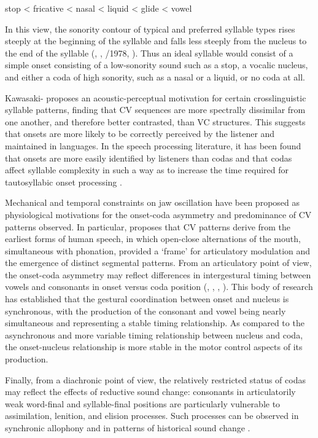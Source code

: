 \ea\label{ex:(1.6)}
  stop < fricative < nasal < liquid < glide < vowel
\z

In this view, the sonority contour of typical and preferred syllable types rises steeply at the beginning of the syllable and falls less steeply from the nucleus to the end of the syllable (\citealt{Zwicky1972}, \citealt{Hooper1976}, \citealt{Greenberg1965}/1978, \citealt{Clements1990}). Thus an ideal syllable would consist of a simple onset consisting of a low-sonority sound such as a stop, a vocalic nucleus, and either a coda of high sonority, such as a nasal or a liquid, or no coda at all.

  Kawasaki-\citet{Fukumori1992} proposes an acoustic-perceptual motivation for certain crosslinguistic syllable patterns, finding that CV sequences are more spectrally dissimilar from one another, and therefore better contrasted, than VC structures. This suggests that onsets are more likely to be correctly perceived by the listener and maintained in languages. In the speech processing literature, it has been found that onsets are more easily identified by listeners than codas \citep{ContentEtAl2001} and that codas affect syllable complexity in such a way as to increase the time required for tautosyllabic onset processing \citep{SeguiEtAl1991}. 

  Mechanical and temporal constraints on jaw oscillation have been proposed as physiological motivations for the onset-coda asymmetry and predominance of CV patterns observed. In particular, \citet{MacNeilage1998} proposes that CV patterns derive from the earliest forms of human speech, in which open-close alternations of the mouth, simultaneous with phonation, provided a ‘frame’ for articulatory modulation and the emergence of distinct segmental patterns. From an articulatory point of view, the onset-coda asymmetry may reflect differences in intergestural timing between vowels and consonants in onset versus coda position (\citealt{Byrd1996a}, \citealt{BrowmanGoldstein1995}, \citealt{GickEtAl2006}, \citealt{MarinPouplier2010}). This body of research has established that the gestural coordination between onset and nucleus is synchronous, with the production of the consonant and vowel being nearly simultaneous and representing a stable timing relationship. As compared to the asynchronous and more variable timing relationship between nucleus and coda, the onset-nucleus relationship is more stable in the motor control aspects of its production.

  Finally, from a diachronic point of view, the relatively restricted status of codas may reflect the effects of reductive sound change: consonants in articulatorily weak word-final and syllable-final positions are particularly vulnerable to assimilation, lenition, and elision processes. Such processes can be observed in synchronic allophony and in patterns of historical sound change \citep{Bybee2015b}.

